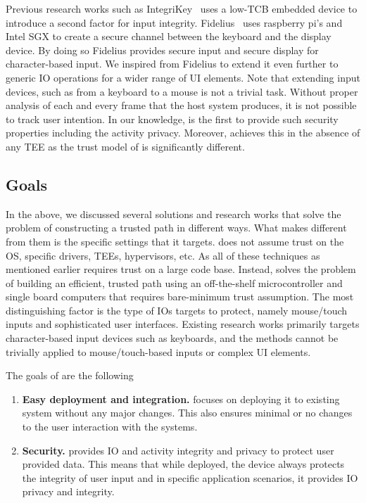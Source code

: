  Previous research works such as IntegriKey~\cite{IntegriKey} uses a low-TCB embedded device to introduce a second factor for input integrity. Fidelius~\cite{Fidelius} uses raspberry pi's and Intel SGX to create a secure channel between the keyboard and the display device. By doing so Fidelius provides secure input and secure display for character-based input. We inspired from Fidelius to extend it even further to generic IO operations for a wider range of UI elements. Note that extending input devices, such as from a keyboard to a mouse is not a trivial task. Without proper analysis of each and every frame that the host system produces, it is not possible to track user intention. In our knowledge, \name is the first to provide such security properties including the activity privacy. Moreover, \name achieves this in the absence of any TEE as the trust model of \name is significantly different. 


\subsection{Goals}

In the above, we discussed several solutions and research works that solve the problem of constructing a trusted path in different ways. What makes \name different from them is the specific settings that it targets. \name does not assume trust on the OS, specific drivers, TEEs, hypervisors, etc. As all of these techniques as mentioned earlier requires trust on a large code base. Instead, \name solves the problem of building an efficient, trusted path using an off-the-shelf microcontroller and single board computers that requires bare-minimum trust assumption. The most distinguishing factor is the type of IOs \name targets to protect, namely mouse/touch inputs and sophisticated user interfaces. Existing research works primarily targets character-based input devices such as keyboards, and the methods cannot be trivially applied to mouse/touch-based inputs or complex UI elements. 

The goals of \name are the following

\begin{enumerate}
  \item \textbf{Easy deployment and integration.} \name focuses on deploying it to existing system without any major changes. This also ensures minimal or no changes to the user interaction with the systems.
  \item \textbf{Security.} \name provides IO and activity integrity and privacy to protect user provided data. This means that while deployed, the device always protects the integrity of user input and in specific application scenarios, it provides IO privacy and integrity.
\end{enumerate}


